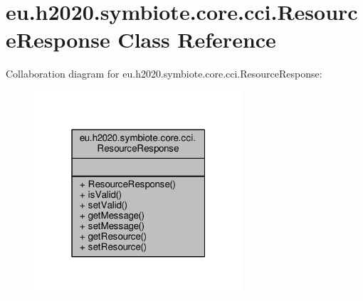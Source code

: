\hypertarget{classeu_1_1h2020_1_1symbiote_1_1core_1_1cci_1_1ResourceResponse}{}\section{eu.\+h2020.\+symbiote.\+core.\+cci.\+Resource\+Response Class Reference}
\label{classeu_1_1h2020_1_1symbiote_1_1core_1_1cci_1_1ResourceResponse}


Collaboration diagram for eu.\+h2020.\+symbiote.\+core.\+cci.\+Resource\+Response\+:
\nopagebreak
\begin{figure}[H]
\begin{center}
\leavevmode
\includegraphics[width=220pt]{classeu_1_1h2020_1_1symbiote_1_1core_1_1cci_1_1ResourceResponse__coll__graph}
\end{center}
\end{figure}

